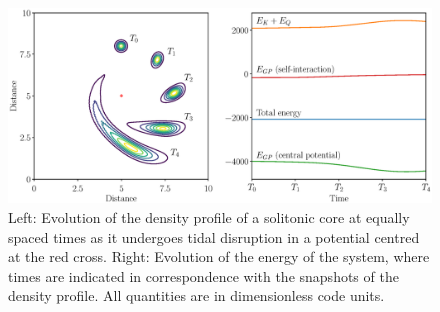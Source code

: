 \documentclass[a4paper,11pt]{article}
\begin{document}





\begin{figure}
  \includegraphics[width=1.1\textwidth,trim=2.5cm 0 0 1cm,clip]{combined_energy_and_density1}
  \caption{Left: Evolution of the density profile of a solitonic core at equally spaced times as it undergoes tidal disruption in a potential centred at the red cross. Right: Evolution of the energy of the system, where times are indicated in correspondence with the snapshots of the density profile. All quantities are in dimensionless code units.}
  \label{fig:combined_1}
\end{figure}
\end{document}
